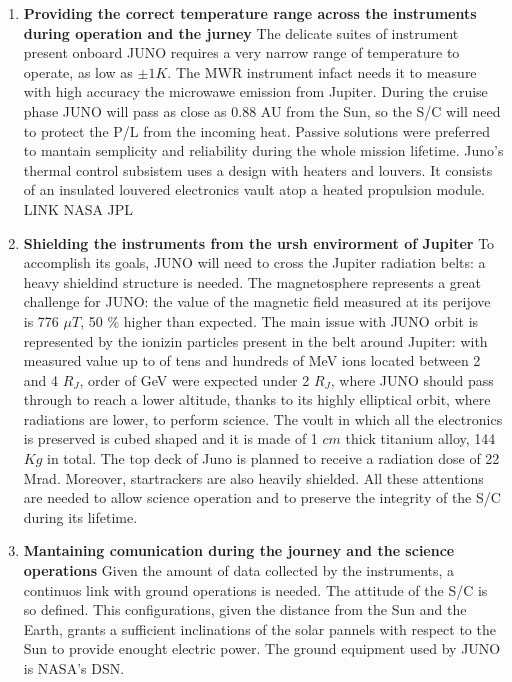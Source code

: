 \begin{enumerate}[leftmargin=1.5em]
    \item \textbf{Providing the correct temperature range across the instruments during operation and the jurney}
    \newline The delicate suites of instrument present onboard JUNO requires a very narrow range of temperature to operate, as 
    low as $\pm 1 K$. The MWR instrument infact needs it to measure with high accuracy the microwawe emission from Jupiter. During the cruise phase JUNO will pass as close as 0.88 AU from the Sun, so the S/C will need to protect the P/L from the incoming heat. Passive solutions were preferred to mantain semplicity and reliability during the whole mission lifetime. Juno's thermal control subsistem uses a design with heaters and louvers. It consists of an insulated louvered electronics vault atop a heated propulsion module. 
    LINK NASA JPL 
    \item \textbf{Shielding the instruments from the ursh envirorment of Jupiter}
    \newline To accomplish its goals, JUNO will need to cross the Jupiter radiation belts: a heavy shieldind structure is needed. The magnetosphere represents a great challenge for JUNO: the value of the magnetic field measured at its perijove is 776 $\mu T$, 50 \% higher than expected. The main issue with JUNO orbit is represented by the ionizin particles present in the belt around Jupiter: with measured value up to of tens and hundreds of MeV ions located between 2 and 4 $R_{J}$, order of GeV were expected under 2 $R_{J}$, where JUNO should pass through to reach a lower altitude, thanks to its highly elliptical orbit, where radiations are lower, to perform science. The voult in which all the electronics is preserved is cubed shaped and it is made of 1 $cm$ thick titanium alloy, 144 $Kg$ in total. The top deck of Juno is planned to receive a radiation dose of 22 Mrad. Moreover, startrackers are also heavily shielded. All these attentions are needed to allow science operation and to preserve the integrity of the S/C during its lifetime. 
    \item \textbf{Mantaining comunication during the journey and the science operations}
    \newline Given the amount of data collected by the instruments, a continuos link with ground operations is needed. The attitude of the S/C is so defined. This configurations, given the distance from the Sun and the Earth, grants a sufficient inclinations of the solar pannels with respect to the Sun to provide enought electric power. The ground equipment used by JUNO is NASA's DSN.  
\end{enumerate}  